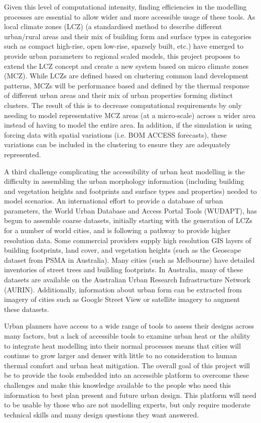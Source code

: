 Given this level of computational intensity, finding efficiencies in the modelling processes are essential to allow wider and more accessible usage of these tools. As local climate zones \cite{Stewart2012b} (LCZ) (a standardised method to describe different urban/rural areas and their mix of building form and surface types in categories such as compact high-rise, open low-rise, sparsely built, etc.) have emerged to provide urban parameters to regional scaled models, this project proposes to extend the LCZ concept and create a new system based on micro climate zones (MCZ)\cite{Nice2020b}. While LCZs are defined based on clustering common land development patterns, MCZs will be performance based and defined by the thermal response of different urban areas and their mix of urban properties forming distinct clusters. The result of this is to decrease computational requirements by only needing to model representative MCZ areas (at a micro-scale) across a wider area instead of having to model the entire area. In addition, if the simulation is using forcing data with spatial variations (i.e. BOM ACCESS forecasts), these variations can be included in the clustering to ensure they are adequately represented.

A third challenge complicating the accessibility of urban heat modelling is the difficulty in assembling the urban morphology information (including building and vegetation heights and footprints and surface types and properties) needed to model scenarios. An international effort to provide a database of urban parameters, the World Urban Database and Access Portal Tools (WUDAPT)\cite{Ching2018}, has begun to assemble coarse datasets, initially starting with the generation of LCZs\cite{Stewart2012b} for a number of world cities, and is following a pathway to provide higher resolution data\cite{Ching2019}. Some commercial providers supply high resolution GIS layers of building footprints, land cover, and vegetation heights (such as the Geoscape dataset from PSMA in Australia). Many cities (such as Melbourne\cite{CBDMelbourne2020}) have detailed inventories of street trees and building footprints. In Australia, many of these datasets are available on the Australian Urban Research Infrastructure Network (AURIN)\cite{Sinnott2015}. Additionally, information about urban form can be extracted from imagery of cities such as Google Street View or satellite imagery\cite{Middel2018,Middel2019,Nice2020} to augment these datasets. 

Urban planners have access to a wide range of tools to assess their designs across many factors, but a lack of accessible tools to examine urban heat or the ability to integrate heat modelling into their normal processes means that cities will continue to grow larger and denser with little to no consideration to human thermal comfort and urban heat mitigation. The overall goal of this project will be to provide the tools embedded into an accessible platform to overcome these challenges and make this knowledge available to the people who need this information to best plan present and future urban design. This platform will need to be usable by those who are not modelling experts, but only require moderate technical skills and many design questions they want answered. 

